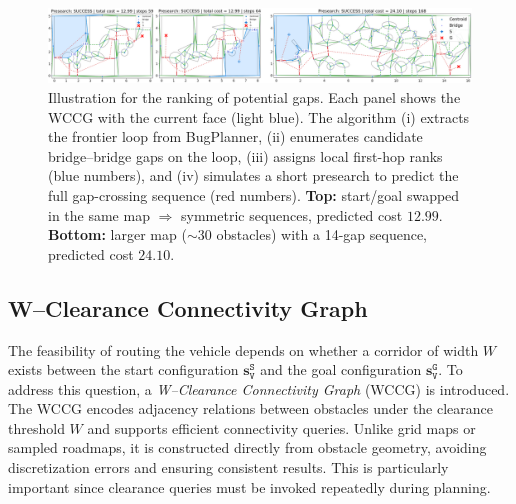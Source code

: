 \begin{figure}[t!]
  \centering
  \includegraphics[width=0.95\linewidth]{figures/presearch.png}%
  \vspace{-0.15in}
\caption{
Illustration for {the ranking of potential gaps.}
Each panel shows the WCCG with the current face (light blue). 
The algorithm (i) extracts the frontier loop from BugPlanner, 
(ii) enumerates candidate bridge--bridge gaps on the loop, 
(iii) assigns local first-hop ranks (blue numbers), 
and (iv) simulates a short presearch to predict the full gap-crossing sequence (red numbers).
\textbf{Top:} start/goal swapped in the same map $\Rightarrow$ symmetric sequences, 
predicted cost $12.99$. 
\textbf{Bottom:} larger map ($\sim30$ obstacles) with a 14-gap sequence, 
predicted cost $24.10$.
}

  \label{fig:presearch}
   \vspace{-4mm}
\end{figure}
\subsection{W--Clearance Connectivity Graph}\label{subsec:wccg}

The feasibility of routing the vehicle depends on whether a corridor of width
$W$ exists between the start configuration $\mathbf{s}_\texttt{V}^{\texttt{S}}$
and the goal configuration $\mathbf{s}_\texttt{V}^{\texttt{G}}$. To address
this question, a \emph{W--Clearance Connectivity Graph} (WCCG) is introduced.
The WCCG encodes adjacency relations between obstacles under the clearance
threshold $W$ and supports efficient connectivity queries. Unlike grid maps or
sampled roadmaps, it is constructed directly from obstacle geometry, avoiding
discretization errors and ensuring consistent results. This is particularly
important since clearance queries must be invoked repeatedly during planning.


